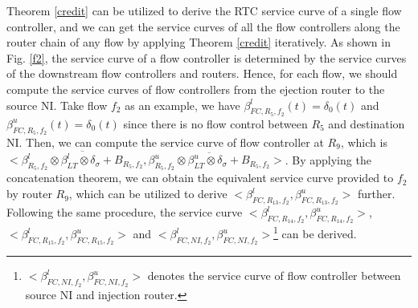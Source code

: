 \documentclass[preprint]{elsarticle}
\begin{document}
Theorem \ref{credit} can be utilized to derive the RTC service curve of a single flow controller, and we can get the service curves of all the flow controllers along the router chain of any flow by applying Theorem \ref{credit} iteratively. As shown in Fig. \ref{f2}, the service curve of a flow controller is determined by the service curves of the downstream flow controllers and routers. Hence, for each flow, we should compute the service curves of flow controllers from the ejection router to the source NI. Take flow $f_2$ as an example, we have $\beta_{FC,R_5,f_2}^l(t)=\delta_0(t)$ and $\beta_{FC,R_5,f_2}^u(t)=\delta_0(t)$ since there is no flow control between $R_5$ and destination NI. Then, we can compute the service curve of flow controller at $R_{9}$, which is $<\overline{\beta_{R_5,f_2}^l\otimes\beta_{LT}^l\otimes\delta_\sigma+B_{R_5,f_2}},\overline{\beta_{R_5,f_2}^u\otimes\beta_{LT}^u\otimes\delta_\sigma+B_{R_5,f_2}}>$. By applying the concatenation theorem, we can obtain the equivalent service curve provided to $f_2$ by router $R_{9}$, which can be utilized to derive $<\beta_{FC,R_{13},f_2}^l,\beta_{FC,R_{13},f_2}^u>$ further. Following the same procedure, the service curve $<\beta_{FC,R_{14},f_2}^l,\beta_{FC,R_{14},f_2}^u>$, $<\beta_{FC,R_{15},f_2}^l,\beta_{FC,R_{15},f_2}^u>$ and $<\beta_{FC,NI,f_2}^l,\beta_{FC,NI,f_2}^u>$\footnote{$<\beta_{FC,NI,f_2}^l,\beta_{FC,NI,f_2}^u>$ denotes the service curve of flow controller between source NI and injection router.} can be derived.
\end{document}

